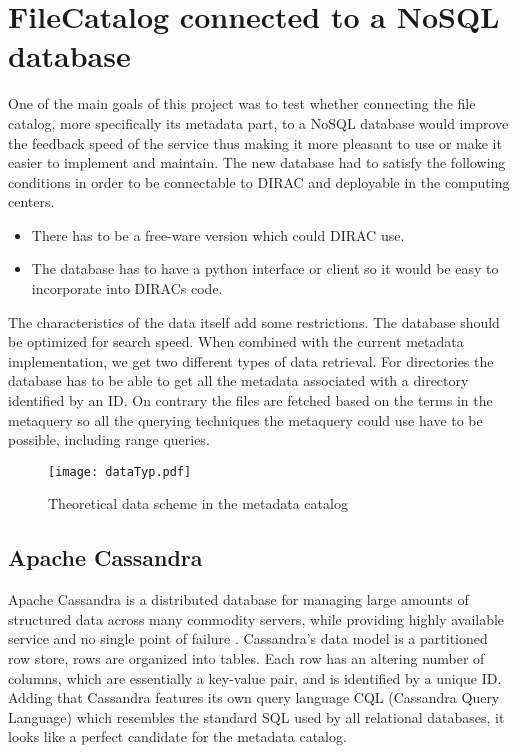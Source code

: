 \chapter{FileCatalog connected to a NoSQL database}
\label{chap:databases}
One of the main goals of this project was to test whether connecting the 
file catalog, more specifically its metadata part, to a NoSQL database would 
improve the feedback speed of the service thus making it more pleasant to use
or make it easier to implement and maintain. The new database had to satisfy the
following conditions in order to be connectable to DIRAC and deployable in
the computing centers.

\begin{itemize}
\item There has to be a free-ware version which could DIRAC use.
\item The database has to have a python interface or client so it would be easy
to incorporate into DIRACs code.
\end{itemize}

The characteristics of the data itself add some restrictions. The database should be
optimized for search speed. When combined with the current metadata implementation, we
get two different types of data retrieval. For directories 
the database has to be able to get all the metadata associated with a directory
identified by an ID. On contrary the files are fetched based on the terms in the metaquery so
all the querying techniques the metaquery could use have to be possible, including
range queries. 

\begin{figure}[h]
\centering
\caption{Theoretical data scheme in the metadata catalog}
\texttt{[image: dataTyp.pdf]}
\label{fig:theoDataScheme}
\end{figure}


\section{Apache Cassandra}
Apache Cassandra is a distributed database for managing large amounts of structured data 
across many commodity servers, while providing highly available service and no single point 
of failure \cite{cassandra}. Cassandra's data model is a
partitioned row store, rows are organized into tables. Each row
has an altering number of columns, which are essentially a
key-value pair, and is identified by a unique ID. Adding that Cassandra features
its own query language CQL (Cassandra Query Language) which resembles the standard SQL 
used by all relational databases, it looks like a perfect candidate for the metadata catalog.

